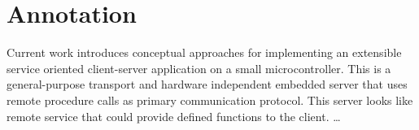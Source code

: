 \clearpage\vspace*{\fill}
\section*{Annotation}

Current work introduces conceptual approaches for implementing an extensible
service oriented client-server application on a small microcontroller.
This is a general-purpose transport and hardware independent embedded server
that uses remote procedure calls as primary communication protocol.
This server looks like remote service that could provide defined functions to
the client. \ldots

\vspace{\fill}
\clearpage